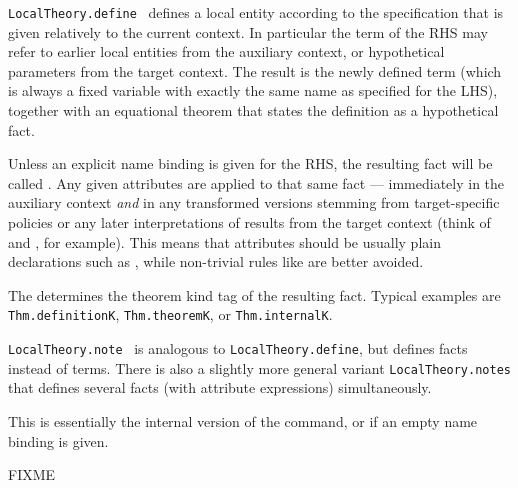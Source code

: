\begin{isabellebody}
\begin{isamarkuptext}
\begin{description}
  \item \verb|LocalTheory.define|~ defines a local entity according to the specification that is
  given relatively to the current  context.  In
  particular the term of the RHS may refer to earlier local entities
  from the auxiliary context, or hypothetical parameters from the
  target context.  The result is the newly defined term (which is
  always a fixed variable with exactly the same name as specified for
  the LHS), together with an equational theorem that states the
  definition as a hypothetical fact.

  Unless an explicit name binding is given for the RHS, the resulting
  fact will be called .  Any given attributes are
  applied to that same fact --- immediately in the auxiliary context
  \emph{and} in any transformed versions stemming from target-specific
  policies or any later interpretations of results from the target
  context (think of \hyperlink{command.locale}{\mbox{}} and \hyperlink{command.interpretation}{\mbox{}},
  for example).  This means that attributes should be usually plain
  declarations such as \hyperlink{attribute.simp}{\mbox{}}, while non-trivial rules like
  \hyperlink{attribute.simplified}{\mbox{}} are better avoided.

  The  determines the theorem kind tag of the resulting
  fact.  Typical examples are \verb|Thm.definitionK|, \verb|Thm.theoremK|, or \verb|Thm.internalK|.

  \item \verb|LocalTheory.note|~ is
  analogous to \verb|LocalTheory.define|, but defines facts instead of
  terms.  There is also a slightly more general variant \verb|LocalTheory.notes| that defines several facts (with attribute
  expressions) simultaneously.

  This is essentially the internal version of the \hyperlink{command.lemmas}{\mbox{}}
  command, or \hyperlink{command.declare}{\mbox{}} if an empty name binding is given.

  \end{description}%
\end{isamarkuptext}%
\isamarkuptrue%
%
\endisatagmlref
{\isafoldmlref}%
%
\isadelimmlref
%
\endisadelimmlref
%
\isamarkuptrue%
%
\begin{isamarkuptext}%
FIXME%
\end{isamarkuptext}%
\isamarkuptrue%
%
\isadelimtheory
%
\endisadelimtheory
%
\isatagtheory
{}\isamarkupfalse%
%
\endisatagtheory
{\isafoldtheory}%
%
\isadelimtheory
%
\endisadelimtheory
\isanewline
\end{isabellebody}%
